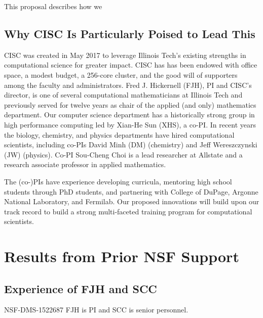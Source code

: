 \documentclass[11pt]{NSFamsart}
\begin{document}
This proposal describes how we 

\subsection{Why CISC Is Particularly Poised to Lead This}
CISC was created in May 2017 to leverage Illinois Tech’s existing strengths in computational science for greater impact.  CISC has has been endowed with office space, a modest budget, a 256-core cluster, and the good will of supporters among the faculty and administrators.  Fred J. Hickernell (FJH), PI and CISC’s director, is one of several computational mathematicians at Illinois Tech and previously served for twelve years as chair of the applied (and only) mathematics department.  Our computer science department has a historically strong group in high performance computing led by Xian-He Sun (XHS), a co-PI.  In recent years the biology, chemistry, and physics departments have hired computational scientists, including co-PIs David Minh (DM) (chemistry) and Jeff Wereszczynski (JW) (physics).  Co-PI Sou-Cheng Choi is a lead researcher at Allstate and a research associate professor in applied mathematics.

The (co-)PIs have experience developing curricula, mentoring high school students through PhD students, and partnering with College of DuPage, Argonne National Laboratory, and Fermilab.  Our proposed innovations will build upon our track record to build a strong multi-faceted training program for computational scientists.

\section{Results from Prior NSF Support} 
\subsection{Experience of FJH and SCC}
NSF-DMS-1522687 \label{SectFJHPrevious}  FJH is PI and SCC is senior personnel.  
\end{document}
